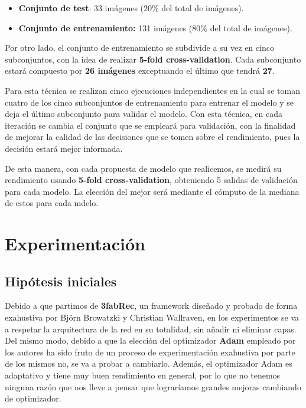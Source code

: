         \begin{itemize}
            \item \textbf{Conjunto de test}: 33 imágenes ($20\%$ del total de imágenes).
            \item \textbf{Conjunto de entrenamiento:} 131 imágenes ($80\%$ del total de imágenes).
        \end{itemize}

        \noindent Por otro lado, el conjunto de entrenamiento se subdivide a su vez en cinco subconjuntos, con la idea de realizar \textbf{5-fold cross-validation}. Cada subconjunto estará compuesto por \textbf{26 imágenes} exceptuando el último que tendrá \textbf{27}.
        
        \medskip

        \noindent Para esta técnica se realizan cinco ejecuciones independientes en la cual se toman cuatro de los cinco subconjuntos de entrenamiento para entrenar el modelo y se deja el último subconjunto para validar el modelo. Con esta técnica, en cada iteración se cambia el conjunto que se empleará para validación, con la finalidad de mejorar la calidad de las decisiones que se tomen sobre el rendimiento, pues la decisión estará mejor informada. 

        \medskip

        \noindent De esta manera, con cada propuesta de modelo que realicemos, se medirá su rendimiento usando \textbf{5-fold cross-validation}, obteniendo 5 salidas de validación para cada modelo. La elección del mejor será mediante el cómputo de la mediana de estos para cada mdelo.


\section{Experimentación}
    \subsection{Hipótesis iniciales}
        \noindent Debido a que partimos de \textbf{3fabRec}, un framework diseñado y probado de forma exahustiva por Björn Browatzki y Christian Wallraven, en los experimentos se va a respetar la arquitectura de la red en su totalidad, sin añadir ni eliminar capas. Del mismo modo, debido a que la elección del optimizador \textbf{Adam} empleado por los autores ha sido fruto de un proceso de experimentación exahustiva por parte de los mismos no, se va a probar a cambiarlo. Además, el optimizador Adam es adaptativo y tiene muy buen rendimiento en general, por lo que no tenemos ninguna razón que nos lleve a pensar que lograríamos grandes mejoras cambiando de optimizador.

